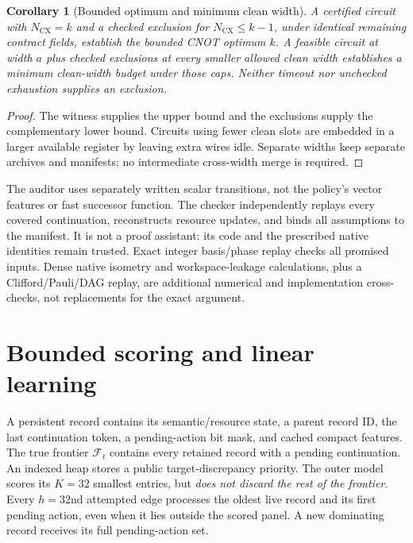 \documentclass[11pt]{article}
\newtheorem{corollary}[theorem]{Corollary}
\theoremstyle{definition}\newtheorem{definition}[theorem]{Definition}
\newcommand{\CN}{N_{\mathrm{CX}}}
\newcommand{\calF}{\mathcal F}
\begin{document}
\begin{corollary}[Bounded optimum and minimum clean width]
A certified circuit with $\CN=k$ and a checked exclusion for $\CN\le k-1$, under identical remaining contract fields, establish the bounded CNOT optimum $k$. A feasible circuit at width $a$ plus checked exclusions at every smaller allowed clean width establishes a minimum clean-width budget under those caps. Neither timeout nor unchecked exhaustion supplies an exclusion.
\end{corollary}
\begin{proof}
The witness supplies the upper bound and the exclusions supply the complementary lower bound. Circuits using fewer clean slots are embedded in a larger available register by leaving extra wires idle. Separate widths keep separate archives and manifests; no intermediate cross-width merge is required.
\end{proof}

The auditor uses separately written scalar transitions, not the policy's vector features or fast successor function. The checker independently replays every covered continuation, reconstructs resource updates, and binds all assumptions to the manifest. It is not a proof assistant: its code and the prescribed native identities remain trusted. Exact integer basis/phase replay checks all promised inputs. Dense native isometry and workspace-leakage calculations, plus a Clifford/Pauli/DAG replay, are additional numerical and implementation cross-checks, not replacements for the exact argument.

\section{Bounded scoring and linear learning}
A persistent record contains its semantic/resource state, a parent record ID, the last continuation token, a pending-action bit mask, and cached compact features. The true frontier $\calF_t$ contains every retained record with a pending continuation. An indexed heap stores a public target-discrepancy priority. The outer model scores its $K=32$ smallest entries, but \emph{does not discard the rest of the frontier}. Every $h=32$nd attempted edge processes the oldest live record and its first pending action, even when it lies outside the scored panel. A new dominating record receives its full pending-action set.
\end{document}
